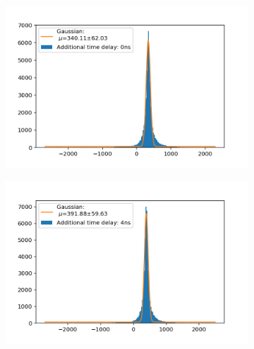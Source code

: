 \documentclass[]{article}
\begin{document}
\begin{figure}[H]
\centering
\medskip
\begin{subfigure}{0.48\textwidth}
\includegraphics[width=\linewidth]{Plots/Time/0ns.png}
\end{subfigure}
\begin{subfigure}[c]{0.48\linewidth}
\includegraphics[width=\linewidth]{Plots/Time/4ns.png}
\end{subfigure}


\end{figure}
\end{document}
